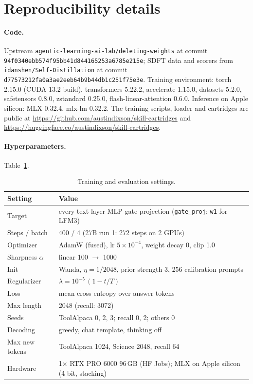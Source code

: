 \documentclass[11pt]{article}
\begin{document}



\appendix
\section{Reproducibility details}
\label{app:repro}

\paragraph{Code.} Upstream \texttt{agentic-learning-ai-lab/deleting-weights} at commit \texttt{94f0340ebb574f95bb41d844165253a6785e215e}; SDFT data and scorers from \texttt{idanshen/Self-Distillation} at commit \texttt{d77573212fa0a3ae2eeb64b9b44db1c251f75e3e}. Training environment: torch 2.15.0 (CUDA 13.2 build), transformers 5.22.2, accelerate 1.15.0, datasets 5.2.0, safetensors 0.8.0, zstandard 0.25.0, flash-linear-attention 0.6.0. Inference on Apple silicon: MLX 0.32.4, mlx-lm 0.32.2. The training scripts, loader and cartridges are public at \url{https://github.com/austindixson/skill-cartridges} and \url{https://huggingface.co/austindixson/skill-cartridges}.

\paragraph{Hyperparameters.} Table~\ref{tab:hparams}.

\begin{table}[h]
\centering
\small
\begin{tabular}{ll}
\toprule
Setting & Value \\
\midrule
Target & every text-layer MLP gate projection (\texttt{gate\_proj}; \texttt{w1} for LFM3) \\
Steps / batch & 400 / 4 (27B run 1: 272 steps on 2 GPUs) \\
Optimizer & AdamW (fused), lr $5\times10^{-4}$, weight decay 0, clip 1.0 \\
Sharpness $\alpha$ & linear 100 $\to$ 1000 \\
Init & Wanda, $\eta = 1/2048$, prior strength 3, 256 calibration prompts \\
Regularizer & $\lambda = 10^{-5}\,(1 - t/T)$ \\
Loss & mean cross-entropy over answer tokens \\
Max length & 2048 (recall: 3072) \\
Seeds & ToolAlpaca 0, 2, 3; recall 0, 2; others 0 \\
Decoding & greedy, chat template, thinking off \\
Max new tokens & ToolAlpaca 1024, Science 2048, recall 64 \\
Hardware & 1$\times$ RTX PRO 6000 96\,GB (HF Jobs); MLX on Apple silicon (4-bit, stacking) \\
\bottomrule
\end{tabular}
\caption{Training and evaluation settings.}
\label{tab:hparams}
\end{table}
\end{document}

